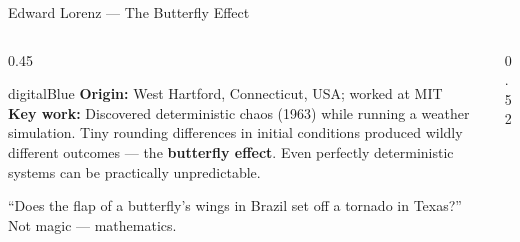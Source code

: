 \begin{frame}[shrink=13]{Edward Lorenz --- The Butterfly Effect}

  \begin{columns}[T]
    \begin{column}{0.45\textwidth}
      \begin{personbox}{digitalBlue}
        \textbf{Origin:} West Hartford, Connecticut, USA; worked at MIT\\[3pt]
        \textbf{Key work:} Discovered \alert{deterministic chaos} (1963)
        while running a weather simulation. Tiny rounding differences in
        initial conditions produced wildly different outcomes ---
        the \textbf{butterfly effect}. Even perfectly deterministic systems
        can be practically unpredictable.
      \end{personbox}

      \vspace{0.3em}
      \begin{insightbox}
        ``Does the flap of a butterfly's wings in Brazil set off a tornado
        in Texas?'' Not magic --- mathematics.
      \end{insightbox}
    \end{column}

    \begin{column}{0.52\textwidth}
    \end{column}
  \end{columns}

\end{frame}

